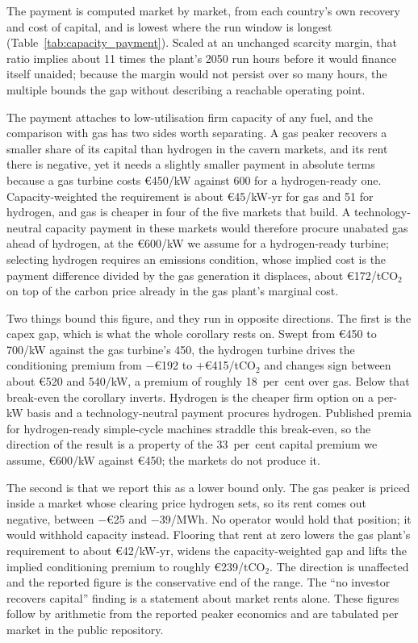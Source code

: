 The payment is computed market by market, from each country's own recovery and cost
of capital, and is lowest where the run window is longest
(Table~\ref{tab:capacity_payment}). Scaled at an unchanged scarcity margin, that ratio implies about 11 times the plant's
2050 run hours before it would finance itself unaided; because the
margin would not persist over so many hours, the multiple bounds the gap without describing a reachable operating point.



The payment attaches to low-utilisation firm capacity of any fuel, and the
comparison with gas has two sides worth separating. A gas peaker recovers a smaller share of
its capital than hydrogen in the cavern markets, and its rent there is negative, yet it
needs a slightly smaller payment in absolute terms because a gas turbine costs
\euro{}450/kW against 600 for a hydrogen-ready one. Capacity-weighted the requirement is
about \euro{}45/kW-yr for gas and 51 for hydrogen, and gas is cheaper in four of the five
markets that build. A technology-neutral
capacity payment in these markets would therefore procure unabated gas ahead of hydrogen, at the \euro{}600/kW we assume for a hydrogen-ready turbine;
selecting hydrogen requires an emissions condition, whose implied cost is the payment
difference divided by the gas generation it displaces, about \euro{}172/tCO$_2$ on top of
the carbon price already in the gas plant's marginal cost.

Two things bound this figure, and they run in opposite directions. The first is the capex gap, which is what the whole
corollary rests on. Swept from \euro{}450 to 700/kW against the gas turbine's 450, the hydrogen turbine
drives the conditioning premium from $-$\euro{}192 to $+$\euro{}415/tCO$_2$ and
changes sign between about \euro{}520 and 540/kW, a premium of roughly 18~per~cent over gas.
Below that break-even the corollary inverts. Hydrogen is the cheaper firm option on a
per-kW basis and a technology-neutral payment procures hydrogen. Published premia for
hydrogen-ready simple-cycle machines straddle this break-even, so the direction of the
result is a property of the 33~per~cent capital premium we assume, \euro{}600/kW against \euro{}450; the markets do not produce it.

The second is that we report this as a lower bound only. The gas peaker
is priced inside a market whose
clearing price hydrogen sets, so its rent comes out negative, between $-$\euro{}25 and $-$39/MWh. No operator would hold that position; it would withhold capacity
instead. Flooring that rent at zero lowers the gas plant's requirement to about
\euro{}42/kW-yr, widens the capacity-weighted gap and lifts
the implied conditioning premium to roughly \euro{}239/tCO$_2$. The direction is
unaffected and the reported figure is the conservative end of the range. The ``no investor recovers
capital'' finding is a statement about market rents alone. These figures follow by arithmetic from
the reported peaker economics and are tabulated per market in the public repository.

